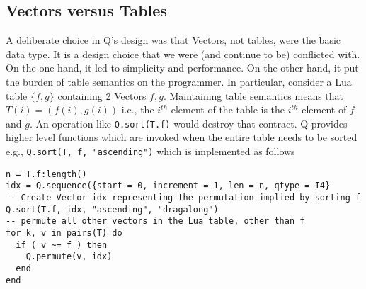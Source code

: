 \subsection{Vectors versus Tables}
\label{vectors_versus_tables}

A deliberate choice in Q's design was that Vectors, not tables, were the basic
data type. It is a design choice that we were (and continue to be) conflicted with. On the one hand,
it led to simplicity and performance. On the other hand, it put the burden of
table semantics on the programmer. In particular, consider a 
Lua table \(\{f, g\}\) containing 2 Vectors \(f, g\). Maintaining table
semantics means that \(T(i) = (f(i), g(i))\)  i.e., the \(i^{th}\) element of
the table is the \(i^{th}\) element of \(f\) and \(g\). An 
operation like {\tt Q.sort(T.f)} would destroy that contract. Q
provides higher level functions which are invoked when the entire table needs to
be sorted e.g., {\tt Q.sort(T, f, "ascending")} which is implemented as follows
\begin{verbatim}
n = T.f:length()
idx = Q.sequence({start = 0, increment = 1, len = n, qtype = I4}
-- Create Vector idx representing the permutation implied by sorting f
Q.sort(T.f, idx, "ascending", "dragalong")
-- permute all other vectors in the Lua table, other than f
for k, v in pairs(T) do 
  if ( v ~= f ) then 
    Q.permute(v, idx)
  end
end
\end{verbatim}
